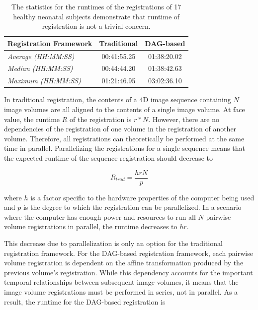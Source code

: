 \begin{table}
\centering
\caption{The statistics for the runtimes of the registrations of 17 healthy neonatal subjects demonstrate that runtime of registration is not a trivial concern.}
\label{tab:runtime-example}
\begin{tabular}{|l|c|c|}
\hline
\textbf{Registration Framework} & \textbf{Traditional} & \textbf{DAG-based} \\ \hline
\textit{Average (HH:MM:SS)}     & 00:41:55.25          & 01:38:20.02        \\ \hline
\textit{Median (HH:MM:SS)}      & 00:44:44.20          & 01:38:42.63        \\ \hline
\textit{Maximum (HH:MM:SS)}     & 01:21:46.95          & 03:02:36.10        \\ \hline
\end{tabular}
\vspace{0.05\textwidth}
\end{table}

In traditional registration, the contents of a 4D image sequence containing $N$ image volumes are all aligned to the contents of a single image volume. At face value, the runtime $R$ of the registration is $r*N$. However, there are no dependencies of the registration of one volume in the registration of another volume. Therefore, all registrations can theoretically be performed at the same time in parallel. Parallelizing the registrations for a single sequence means that the expected runtime of the sequence registration should decrease to 

\begin{equation}
R_{trad} = \frac{hrN}{p}
\end{equation} 

\noindent where $h$ is a factor specific to the hardware properties of the computer being used and $p$ is the degree to which the registration can be parallelized. In a scenario where the computer has enough power and resources to run all $N$ pairwise volume registrations in parallel, the runtime decreases to $hr$. 

This decrease due to parallelization is only an option for the traditional registration framework. For the DAG-based registration framework, each pairwise volume registration is dependent on the affine transformation produced by the previous volume's registration. While this dependency accounts for the important temporal relationships between subsequent image volumes, it means that the image volume registrations must be performed in series, not in parallel. As a result, the runtime for the DAG-based registration is

